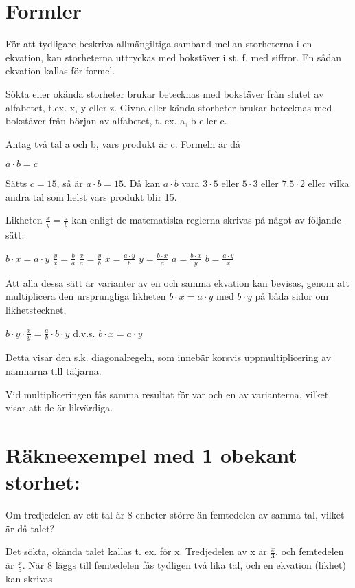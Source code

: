 \section{Formler}
För att tydligare beskriva allmängiltiga samband mellan storheterna i en
ekvation, kan storheterna uttryckas med bokstäver i st. f. med siffror. En sådan
ekvation kallas för formel.

Sökta eller okända storheter brukar betecknas med bokstäver från slutet av
alfabetet, t.ex. x, y eller z. Givna eller kända storheter brukar betecknas med
bokstäver från början av alfabetet, t. ex. a, b eller c.

Antag två tal a och b, vars produkt är c.
Formeln är då

\(a \cdot b = c\)

Sätts \(c = 15\), så är \(a \cdot b = 15\). Då kan \(a \cdot b\) vara \(3 \cdot 5\)
eller \(5 \cdot 3\) eller \(7.5 \cdot 2\) eller vilka andra tal som helst vars
produkt blir 15.

Likheten \(\frac{x}{y} = \frac{a}{b}\) kan enligt de matematiska reglerna skrivas
på något av följande sätt:

\(b \cdot x = a \cdot y\) \(\frac{y}{x} = \frac{b}{a}\) \(\frac{x}{a} = \frac{y}{b}\) \(x = \frac{a \cdot y}{b}\)
\(y = \frac{b \cdot x}{a}\) \(a = \frac{b \cdot x}{y}\) \(b = \frac{a \cdot y}{x}\)

Att alla dessa sätt är varianter av en och samma ekvation kan bevisas, genom att
multiplicera den ursprungliga likheten \(b \cdot x = a \cdot y\) med \(b \cdot y\)
på båda sidor om likhetstecknet,

\(b \cdot y \cdot \frac{x}{y} = \frac{a}{b} \cdot b \cdot y\) d.v.s. \(b \cdot x = a \cdot y\)

Detta visar den s.k. diagonalregeln, som innebär korsvis uppmultiplicering av
nämnarna till täljarna.

Vid multipliceringen fås samma resultat för var och en av varianterna, vilket
visar att de är likvärdiga.

\section{Räkneexempel med 1 obekant storhet:}
Om tredjedelen av ett tal är 8 enheter större än femtedelen av samma tal, vilket
är då talet?

Det sökta, okända talet kallas t. ex. för x. Tredjedelen av x är \(\frac{x}{3}\). och femtedelen är \(\frac{x}{5}\).
När 8 läggs till femtedelen fås tydligen två lika tal, och en ekvation (likhet)
kan skrivas

